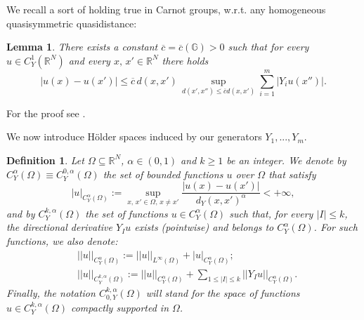 \documentclass{article}
\newtheorem{lemma}[theorem]{Lemma}
\newtheorem{definition}[theorem]{Definition}
\numberwithin{equation}{section}
\begin{document}
\vspace{2mm}

\hspace{-7mm} We recall a sort of  holding true in Carnot groups, w.r.t. any homogeneous quasisymmetric quasidistance:

\vspace{2mm}

\begin{lemma} \label{UGE Lemma 7.6}
    There exists a constant $\overline{c}=\overline{c}(\mathbb{G})>0$ such that for every $u \in C^1_Y(\mathbb{R}^N)$ and every $x, \, x' \in \mathbb{R}^N$ there holds
    \begin{equation*}
        |u(x)-u(x')| \leq \overline{c} \, d(x,x') \, \sup_{d(x',x'') \leq \overline{c}d(x,x')} \sum_{i=1}^m |Y_i u(x'')|.
    \end{equation*}
\end{lemma}

\vspace{2mm}

\hspace{-7mm} For the proof see \cite[Lemma 7.6]{UGE}.

\vspace{2mm}

\hspace{-7mm} We now introduce Hölder spaces induced by our generators $Y_1,...,Y_m$.

\vspace{2mm}

\begin{definition}
\label{def Hölder space}
    Let $\Omega \subseteq \mathbb{R}^N$, $\alpha \in (0,1)$ and $k \geq 1$ be an integer. We denote by $C^{\alpha}_Y(\Omega) \equiv C^{0,\alpha}_Y(\Omega)$ the set of bounded functions $u$ over $\Omega$ that satisfy
    \begin{equation*}
        |u|_{C^{\alpha}_Y(\Omega)} := \sup_{x,\, x' \in \Omega, \, x \neq x'} \frac{|u(x)-u(x')|}{d_Y(x,x')^{\alpha}} < +\infty,
    \end{equation*}
    and by $C^{k,\alpha}_Y(\Omega)$ the set of functions $u \in C^{\alpha}_Y(\Omega)$ such that, for every $|I| \leq k$, the directional derivative $Y_I u$ exists (pointwise) and belongs to $C^{\alpha}_Y(\Omega)$.
    For such functions, we also denote:
    \begin{align*}
        & ||u||_{C^{\alpha}_Y(\Omega)} := ||u||_{L^{\infty}(\Omega)} + |u|_{C^{\alpha}_Y(\Omega)}; \\
        & ||u||_{C^{k,\alpha}_Y(\Omega)}:= ||u||_{C^{\alpha}_Y(\Omega)} + \sum_{1 \leq |I| \leq k} ||Y_I u||_{C^{\alpha}_Y(\Omega)}.
    \end{align*}
    Finally, the notation $C^{k,\alpha}_{0,Y}(\Omega)$ will stand for the space of functions  $u \in C^{k,\alpha}_Y(\Omega)$ compactly supported in $\Omega$.
\end{definition}
\end{document}
